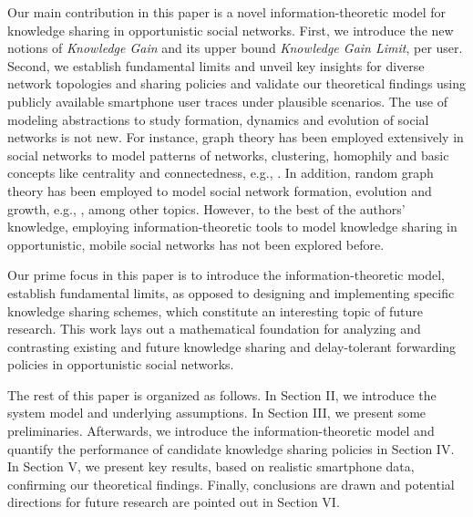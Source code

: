 \documentclass[conference]{IEEEtran}
\theoremstyle{definition}
\begin{document}
Our main contribution in this paper is a novel information-theoretic
model for knowledge sharing in opportunistic social networks. 
First, we introduce the new notions of {\it Knowledge Gain} and 
its upper bound {\it Knowledge Gain Limit}, per user.
Second, we establish fundamental limits and unveil key insights for 
diverse network topologies and sharing policies and validate 
our theoretical findings using publicly available smartphone user traces
under plausible scenarios. The use of modeling abstractions to study formation, 
dynamics and evolution of social networks is not new. For instance, graph theory has been employed extensively 
in social networks to model patterns of networks, clustering, homophily and basic concepts like centrality and connectedness, e.g., \cite{jackson,graph1,graph3}. In addition, random graph theory has been employed to model social network formation, evolution and growth, e.g., \cite{erdos,bollobas,wasserman,graph2}, among other topics. However, to the best of the authors' knowledge, employing information-theoretic tools to model knowledge sharing in opportunistic, mobile social networks has not been explored before.

Our prime focus in this paper is to introduce the information-theoretic model, establish fundamental limits, as opposed to designing and implementing specific knowledge sharing schemes, which constitute an interesting topic of future research. This work lays out a 
mathematical foundation for analyzing and contrasting existing and future 
knowledge sharing and delay-tolerant forwarding policies in opportunistic social networks.


The rest of this paper is organized as follows. In Section II, we introduce 
the system model and underlying assumptions. In Section III, we present
some preliminaries. Afterwards, we introduce the information-theoretic model 
and quantify the performance of candidate knowledge sharing policies in Section IV. 
In Section V, we present key results, based on realistic smartphone data, confirming 
our theoretical findings. Finally, conclusions are drawn and potential directions for 
future research are pointed out in Section VI.
\vspace{-0.1 cm}
\end{document}
